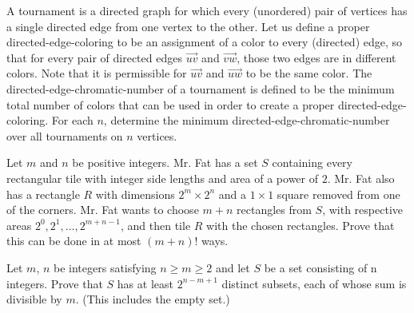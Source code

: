 \documentclass{article}
\begin{document}
\begin{prob}{9}
A tournament is a directed graph for which every (unordered) pair of vertices has a single directed edge from one vertex to the other.  Let us define a proper directed-edge-coloring to be an assignment of a color to every (directed) edge, so that for every pair of directed edges $\overrightarrow{uv}$ and $\overrightarrow{vw}$, those two edges are in different colors.  Note that it is permissible for $\overrightarrow{uv}$ and $\overrightarrow{uw}$ to be the same color.  The directed-edge-chromatic-number of a tournament is defined to be the minimum total number of colors that can be used in order to create a proper directed-edge-coloring.  For each $n$, determine the minimum directed-edge-chromatic-number over all tournaments on $n$ vertices.
\end{prob}

\begin{prob}{13}
Let $m$ and $n$ be positive integers.  Mr. Fat has a set $S$ containing every rectangular tile with integer side lengths and area of a power of $2$.  Mr. Fat also has a rectangle $R$ with dimensions $2^m \times 2^n$ and a $1 \times 1$ square removed from one of the corners.  Mr. Fat wants to choose $m + n$ rectangles from $S$, with respective areas $2^0, 2^1, \ldots, 2^{m + n - 1}$, and then tile $R$ with the chosen rectangles.  Prove that this can be done in at most $(m + n)!$ ways.
\end{prob}

\begin{prob}{13}
Let $m$, $n$ be integers satisfying $n \geq m \geq 2$ and let $S$ be a set consisting of n integers. Prove that $S$ has at least $2^{n-m+1}$ distinct subsets, each of whose sum is divisible by $m$. (This includes the empty set.)
\end{prob}
\end{document}
